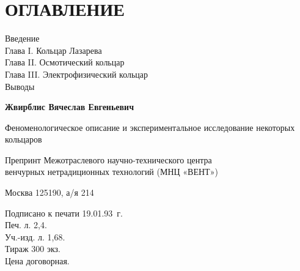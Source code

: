 \documentclass[12pt,a4paper]{article}
\begin{document}
\newpage
\section*{ОГЛАВЛЕНИЕ}

\begin{tabbing}
Введение  \\
Глава I. Кольцар Лазарева  \\
Глава II. Осмотический кольцар  \\
Глава III. Электрофизический кольцар  \\
Выводы  \\
\end{tabbing}

\vfill
\begin{flushleft}
\textbf{Жвирблис Вячеслав Евгеньевич}

\medskip
Феноменологическое описание и экспериментальное исследование некоторых кольцаров

\medskip
Препринт Межотраслевого научно-технического центра\\
венчурных нетрадиционных технологий (МНЦ «ВЕНТ»)

\medskip
Москва 125190, а/я 214
\end{flushleft}

\begin{flushright}
Подписано к печати 19.01.93~г.\\
Печ. л. 2,4.\\
Уч.-изд. л. 1,68.\\
Тираж 300 экз.\\
Цена договорная.
\end{flushright}
\end{document}

